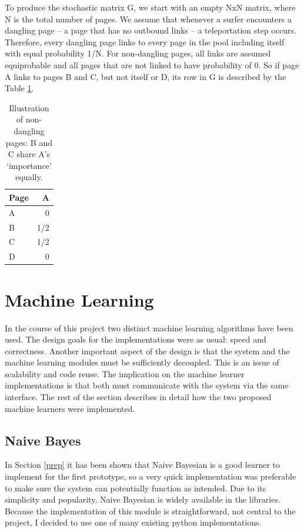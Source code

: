 \documentclass[12pt,notitlepage,twoside]{scrreprt}
\begin{document}
To produce the stochastic matrix G, we start with an empty NxN matrix, where N
is the total number of pages. We assume that whenever a surfer encounters a
dangling page -- a page that has no outbound links -- a teleportation step
occurs. Therefore, every dangling page links to every page in the pool
including itself with equal probability 1/N. For non-dangling pages, all links
are assumed equiprobable and all pages that are not linked to have probability
of 0. So if page A links to pages B and C, but not itself or D, its row in G is
described by the Table \ref{tab}.

\begin{table}
    \begin{center}
      \begin{tabular}{|l|r|}
        \hline
        Page & A \\ \hline
         A &  0  \\ \hline
         B & 1/2 \\ \hline
         C & 1/2 \\ \hline
         D & 0   \\ \hline
      \end{tabular}
      \caption{Illustration of non-dangling pages: B and C share A's `importance' equally.\label{tab}}
  \end{center}
\end{table}

\section{Machine Learning}
In the course of this project two distinct machine learning algorithms have
been used. The design goals for the implementations were as usual: speed and
correctness. Another important aspect of the design is that the system and the
machine learning modules must be sufficiently decoupled. This is an issue of
scalability and code reuse. The implication on the machine learner
implementations is that both must communicate with the system via the same
interface. The rest of the section describes in detail how the two proposed
machine learners were implemented.

\subsection{Naive Bayes}
In Section \ref{prep} it has been shown that Naive Bayesian is a good learner
to implement for the first prototype, so a very quick implementation was
preferable to make sure the system can potentially function as intended. Due to
its simplicity and popularity, Naive Bayesian is widely available in the
libraries. Because the implementation of this module is straightforward, not
central to the project, I decided to use one of many existing python
implementations. 
\end{document}
